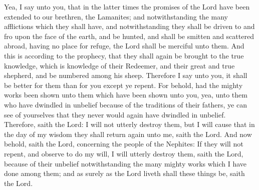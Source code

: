 Yea, I say unto you, that in the latter times the promises of the Lord have been extended to our brethren, the Lamanites; and notwithstanding the many afflictions which they shall have, and notwithstanding they shall be driven to and fro upon the face of the earth, and be hunted, and shall be smitten and scattered abroad, having no place for refuge, the Lord shall be merciful unto them.
\bverse \iffalse And this is according to the prophecy, that they shall again be brought to the true knowledge, which is knowledge of their Redeemer, and their great and true shepherd, and be numbered among his sheep. \fi
And this is according to the prophecy, that they shall again be brought to the true knowledge, which is knowledge of their Redeemer, and their great and true shepherd, and be numbered among his sheep.
\bverse \iffalse Therefore I say unto you, it shall be better for them than for you except ye repent. \fi
Therefore I say unto you, it shall be better for them than for you except ye repent.
\bverse \iffalse For behold, had the mighty works been shown unto them which have been shown unto you, yea, unto them who have dwindled in unbelief because of the traditions of their fathers, ye can see of yourselves that they never would again have dwindled in unbelief. \fi
For behold, had the mighty works been shown unto them which have been shown unto you, yea, unto them who have dwindled in unbelief because of the traditions of their fathers, ye can see of yourselves that they never would again have dwindled in unbelief.
\bverse \iffalse Therefore, saith the Lord: I will not utterly destroy them, but I will cause that in the day of my wisdom they shall return again unto me, saith the Lord. \fi
Therefore, saith the Lord: I will not utterly destroy them, but I will cause that in the day of my wisdom they shall return again unto me, saith the Lord.
\bverse \iffalse And now behold, saith the Lord, concerning the people of the Nephites: If they will not repent, and observe to do my will, I will utterly destroy them, saith the Lord, because of their unbelief notwithstanding the many mighty works which I have done among them; and as surely as the Lord liveth shall these things be, saith the Lord. \fi
And now behold, saith the Lord, concerning the people of the Nephites: If they will not repent, and observe to do my will, I will utterly destroy them, saith the Lord, because of their unbelief notwithstanding the many mighty works which I have done among them; and as surely as the Lord liveth shall these things be, saith the Lord.

